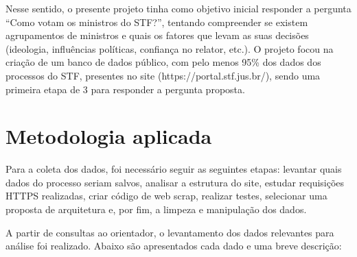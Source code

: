 	Nesse sentido, o presente projeto tinha como objetivo inicial responder a pergunta “Como votam os ministros do STF?”, tentando compreender se existem agrupamentos de ministros e quais os fatores que levam as suas decisões (ideologia, influências políticas, confiança no relator, etc.). O projeto focou na criação de um banco de dados público, com pelo menos 95\% dos dados dos processos do STF, presentes no site (https://portal.stf.jus.br/), sendo uma primeira etapa de 3 para responder a pergunta proposta. 

\section{Metodologia aplicada}

	Para a coleta dos dados, foi necessário seguir as seguintes etapas: levantar quais dados do processo seriam salvos, analisar a estrutura do site, estudar requisições HTTPS realizadas, criar código de web scrap, realizar testes, selecionar uma proposta de arquitetura e, por fim, a limpeza e manipulação dos dados. 

	A partir de consultas ao orientador, o levantamento dos dados relevantes para análise foi realizado. Abaixo são apresentados cada dado e uma breve descrição:
    
